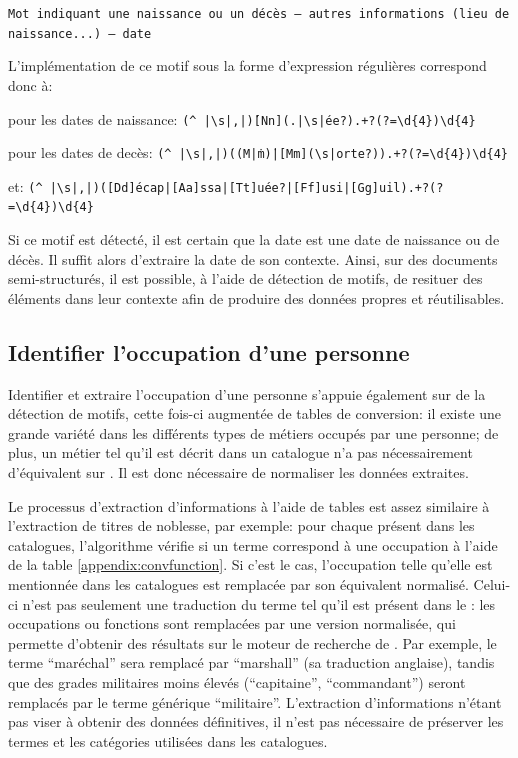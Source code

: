 \begin{center}
	\texttt{Mot indiquant une naissance ou un décès -- autres informations (lieu de naissance...) -- date}
\end{center}

L'implémentation de ce motif sous la forme d'\glspl{expression régulière} correspond donc à:

\begin{center}
	pour les dates de naissance: \texttt{(\^~|\textbackslash{}s|,|\.)[Nn](.|\textbackslash{}s|ée?).+?(?=\textbackslash{}d\{4\})\textbackslash{}d\{4\}}
	
	pour les dates de decès: \texttt{(\^~|\textbackslash{}s|,|\.)((M\.|m\.)|[Mm](\textbackslash{}s|orte?)).+?(?=\textbackslash{}d\{4\})\textbackslash{}d\{4\}}
	
	et: \texttt{(\^~|\textbackslash{}s|,|\.)([Dd]écap|[Aa]ssa|[Tt]uée?|[Ff]usi|[Gg]uil).+?(?=\textbackslash{}d\{4\})\textbackslash{}d\{4\}}
\end{center}

Si ce motif est détecté, il est certain que la date est une date de naissance ou de décès. Il suffit alors d'extraire la date de son contexte. Ainsi, sur des documents semi-structurés, il est possible, à l'aide de détection de motifs, de resituer des éléments dans leur contexte afin de produire des données propres et réutilisables.

\subsection{Identifier l'occupation d'une personne}
Identifier et extraire l'occupation d'une personne s'appuie également sur de la détection de motifs, cette fois-ci augmentée de tables de conversion: il existe une grande variété dans les différents types de métiers occupés par une personne; de plus, un métier tel qu'il est décrit dans un catalogue n'a pas nécessairement d'équivalent sur \wkd{}. Il est donc nécessaire de normaliser les données extraites. 

Le processus d'extraction d'informations à l'aide de tables est assez similaire à l'extraction de titres de noblesse, par exemple: pour chaque \ttrait{} présent dans les catalogues, l'algorithme vérifie si un terme correspond à une occupation à l'aide de la table \ref{appendix:convfunction}. Si c'est le cas, l'occupation telle qu'elle est mentionnée dans les catalogues est remplacée par son équivalent normalisé. Celui-ci n'est pas seulement une traduction du terme tel qu'il est présent dans le \ttrait{}: les occupations ou fonctions sont remplacées par une version normalisée, qui permette d'obtenir des résultats sur le moteur de recherche de \wkd{}. Par exemple, le terme \enquote{maréchal} sera remplacé par \enquote{marshall} (sa traduction anglaise), tandis que des grades militaires moins élevés (\enquote{capitaine}, \enquote{commandant}) seront remplacés par le terme générique \enquote{militaire}. L'extraction d'informations n'étant pas viser à obtenir des données définitives, il n'est pas nécessaire de préserver les termes et les catégories utilisées dans les catalogues.

